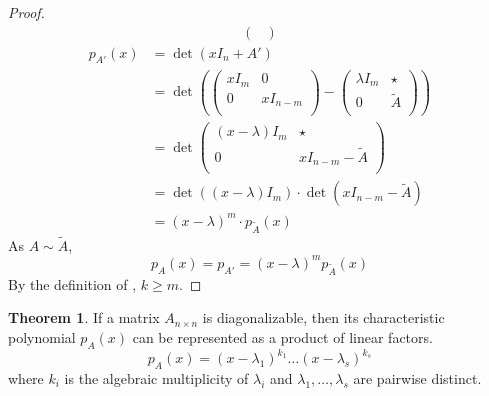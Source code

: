 \documentclass[fleqn, a4paper, 12pt]{article}
\theoremstyle{definition}
\theoremstyle{theorem}
\newtheorem{theorem}{Theorem} %
\theoremstyle{remark}
\numberwithin{corollary}{theorem}
\numberwithin{equation}{theorem}
\begin{document}
\begin{proof}
\begin{align*}
\begin{pmatrix}
				\end{pmatrix}
	\end{align*}
	\begin{align*}
		p_{A'} (x) &= \det (x I_n + A')\\
		&= \det 
			\left( 
				\begin{pmatrix}
					x I_m & 0\\
					0 & x I_{n - m}\\
				\end{pmatrix}
				-
				\begin{pmatrix}
					\lambda I_m & \star\\
					0 & \widetilde{A}\\
				\end{pmatrix}
			 \right)\\
		 &= \det
		 	\begin{pmatrix}
			 	(x - \lambda) I_m & \star\\
			 	0 & x I_{n - m} - \widetilde{A}\\
		 	\end{pmatrix}\\
	 	&= \det ((x - \lambda) I_m) \cdot \det (x I_{n - m} - \widetilde{A})\\
	 	&= (x - \lambda)^m \cdot p_{\widetilde{A}} (x)
	\end{align*}
	As $A \sim \widetilde{A}$,
	\begin{equation*}
		p_A (x) = p_{A'} = (x - \lambda)^m p_{\widetilde{A}} (x)
	\end{equation*}
	By the definition of , $k \geq m$.
\end{proof}

\begin{theorem}
	If a matrix $A_{n \times n}$ is diagonalizable, then its characteristic polynomial $p_A (x)$ can be represented as a product of linear factors.
	\begin{equation*}
		p_A (x) = (x - \lambda_1)^{k_1} \dots (x - \lambda_s)^{k_s}
	\end{equation*}
	where $k_i$ is the algebraic multiplicity of $\lambda_i$ and $\lambda_1, \dots, \lambda_s$ are pairwise distinct.
\end{theorem}
\end{document}
